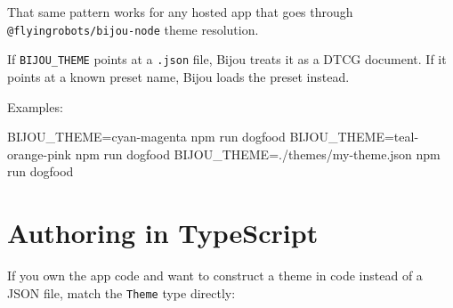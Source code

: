 That same pattern works for any hosted app that goes through \texttt{@\allowbreak{}f\allowbreak{}l\allowbreak{}y\allowbreak{}i\allowbreak{}n\allowbreak{}g\allowbreak{}r\allowbreak{}o\allowbreak{}b\allowbreak{}o\allowbreak{}t\allowbreak{}s\allowbreak{}/\allowbreak{}b\allowbreak{}i\allowbreak{}j\allowbreak{}o\allowbreak{}u\allowbreak{}-\allowbreak{}n\allowbreak{}o\allowbreak{}d\allowbreak{}e} theme resolution.

If \texttt{B\allowbreak{}I\allowbreak{}J\allowbreak{}O\allowbreak{}U\allowbreak{}\_\allowbreak{}T\allowbreak{}H\allowbreak{}E\allowbreak{}M\allowbreak{}E} points at a \texttt{.\allowbreak{}j\allowbreak{}s\allowbreak{}o\allowbreak{}n} file, Bijou treats it as a DTCG document. If it points at a known preset name, Bijou loads the preset instead.

Examples:

\begin{CodeBlock}
BIJOU_THEME=cyan-magenta npm run dogfood
BIJOU_THEME=teal-orange-pink npm run dogfood
BIJOU_THEME=./themes/my-theme.json npm run dogfood
\end{CodeBlock}

\section{Authoring in TypeScript}\label{record-026-authoring-in-typescript}

If you own the app code and want to construct a theme in code instead of a JSON file, match the \texttt{T\allowbreak{}h\allowbreak{}e\allowbreak{}m\allowbreak{}e} type directly:

